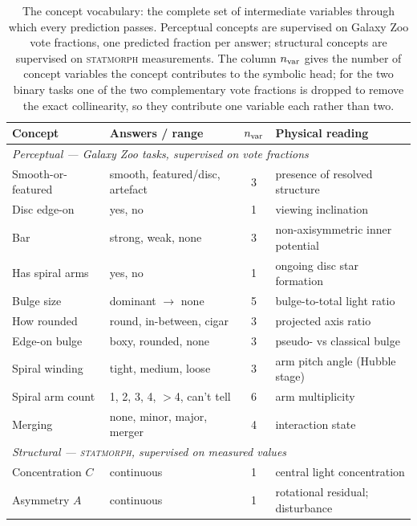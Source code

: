 \documentclass[11pt]{article}
\begin{document}
\begin{table}[htbp]
\centering
\caption{The concept vocabulary: the complete set of intermediate variables
through which every prediction passes. Perceptual concepts are supervised on
Galaxy Zoo vote fractions, one predicted fraction per answer; structural
concepts are supervised on \textsc{statmorph} measurements. The column
$n_{\rm var}$ gives the number of concept variables the concept contributes to
the symbolic head; for the two binary tasks one of the two complementary vote
fractions is dropped to remove the exact collinearity, so they contribute one
variable each rather than two.}
\label{tab:concepts}
\small
\setlength{\tabcolsep}{4pt}
\begin{tabular}{llcl}
\toprule
Concept & Answers / range & $n_{\rm var}$ & Physical reading \\
\midrule
\multicolumn{4}{l}{\emph{Perceptual --- Galaxy Zoo tasks, supervised on vote fractions}}\\
Smooth-or-featured & smooth, featured/disc, artefact & 3 & presence of resolved structure \\
Disc edge-on       & yes, no                        & 1 & viewing inclination \\
Bar                & strong, weak, none             & 3 & non-axisymmetric inner potential \\
Has spiral arms    & yes, no                        & 1 & ongoing disc star formation \\
Bulge size         & dominant $\rightarrow$ none    & 5 & bulge-to-total light ratio \\
How rounded        & round, in-between, cigar       & 3 & projected axis ratio \\
Edge-on bulge      & boxy, rounded, none            & 3 & pseudo- vs classical bulge \\
Spiral winding     & tight, medium, loose           & 3 & arm pitch angle (Hubble stage) \\
Spiral arm count   & 1, 2, 3, 4, $>$4, can't tell   & 6 & arm multiplicity \\
Merging            & none, minor, major, merger     & 4 & interaction state \\
\midrule
\multicolumn{4}{l}{\emph{Structural --- \textsc{statmorph}, supervised on measured values}}\\
Concentration $C$      & continuous & 1 & central light concentration \\
Asymmetry $A$          & continuous & 1 & rotational residual; disturbance \\

\end{tabular}
\end{table}
\end{document}
